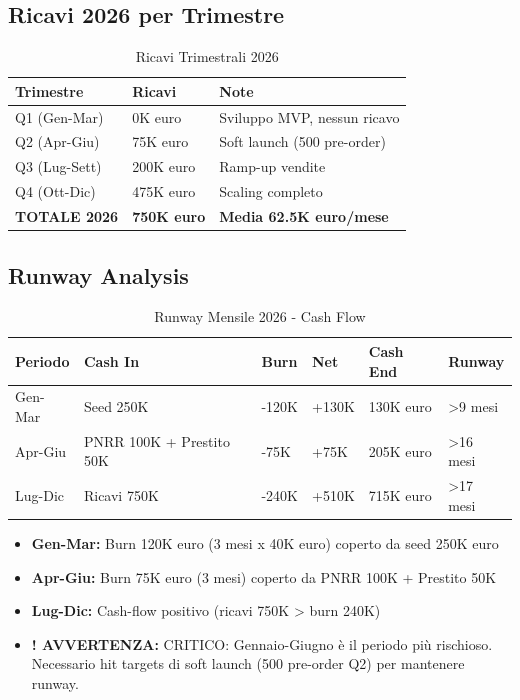 \documentclass[11pt,a4paper]{report}
\newcommand{\warningtext}{\textbf{! AVVERTENZA: }}
\begin{document}
\subsection{Ricavi 2026 per Trimestre}
\begin{table}[H]
\centering
\caption{Ricavi Trimestrali 2026}
\label{tab:quarterly-revenue}
\begin{tabular}{L{2cm} C{2cm} C{2.5cm}}
\toprule
{\bf Trimestre} & {\bf Ricavi} & {\bf Note} \\
\midrule
Q1 (Gen-Mar) & 0K euro & Sviluppo MVP, nessun ricavo \\
Q2 (Apr-Giu) & 75K euro & Soft launch (500 pre-order) \\
Q3 (Lug-Sett) & 200K euro & Ramp-up vendite \\
Q4 (Ott-Dic) & 475K euro & Scaling completo \\
\midrule
{\bf TOTALE 2026} & {\bf 750K euro} & {\bf Media 62.5K euro/mese} \\
\bottomrule
\end{tabular}
\end{table}

\subsection{Runway Analysis}
\begin{table}[H]
\centering
\caption{Runway Mensile 2026 - Cash Flow}
\label{tab:runway-monthly}
\begin{tabular}{L{2cm} C{1.8cm} C{1.8cm} C{1.8cm} C{1.8cm} C{1.5cm}}
\toprule
{\bf Periodo} & {\bf Cash In} & {\bf Burn} & {\bf Net} & {\bf Cash End} & {\bf Runway} \\
\midrule
Gen-Mar & Seed 250K & -120K & +130K & 130K euro & >9 mesi \\
Apr-Giu & PNRR 100K + Prestito 50K & -75K & +75K & 205K euro & >16 mesi \\
Lug-Dic & Ricavi 750K & -240K & +510K & 715K euro & >17 mesi \\
\bottomrule
\end{tabular}
\end{table}

\begin{itemize}
\item {\bf Gen-Mar:} Burn 120K euro (3 mesi x 40K euro) coperto da seed 250K euro
\item {\bf Apr-Giu:} Burn 75K euro (3 mesi) coperto da PNRR 100K + Prestito 50K
\item {\bf Lug-Dic:} Cash-flow positivo (ricavi 750K > burn 240K)
\item {\warningtext CRITICO:} Gennaio-Giugno è il periodo più rischioso. Necessario hit targets di soft launch (500 pre-order Q2) per mantenere runway.
\end{itemize}
\end{document}
